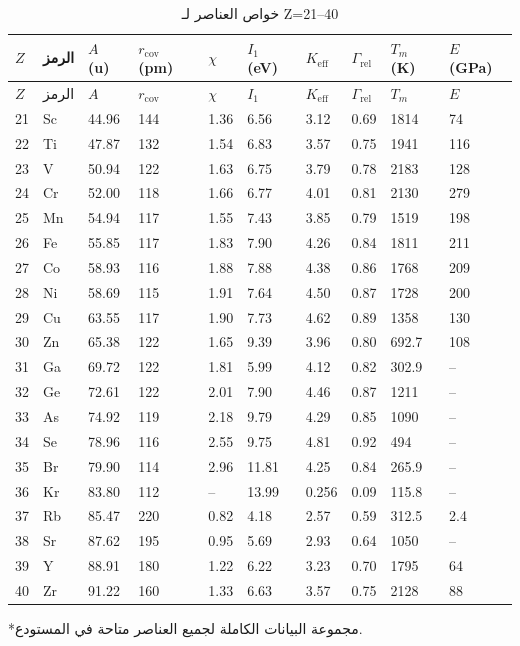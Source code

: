 \documentclass[11pt,a4paper]{article}
\newcommand{\Keff}{K_{\mathrm{eff}}}
\begin{document}
\begin{otherlanguage}{arabic}
		\begin{longtable}{p{0.6cm}p{1.2cm}p{1.2cm}p{1.2cm}p{1.2cm}p{1.2cm}p{1.5cm}p{1.2cm}p{1.2cm}p{1.2cm}}
			\caption{خواص العناصر لـ Z=21–40} \label{tab:elem-data-21to40} \\
			\toprule
			\(Z\) & الرمز & \(A\) (u) & \(r_{\text{cov}}\) (pm) & \(\chi\) & \(I_1\) (eV) & \(\Keff\) & \(\Gamma_{\text{rel}}\) & \(T_m\) (K) & \(E\) (GPa) \\
			\midrule
			\endfirsthead
			\toprule
			\(Z\) & الرمز & \(A\) & \(r_{\text{cov}}\) & \(\chi\) & \(I_1\) & \(\Keff\) & \(\Gamma_{\text{rel}}\) & \(T_m\) & \(E\) \\
			\midrule
			\endhead
			21 & Sc & 44.96 & 144 & 1.36 & 6.56 & 3.12 & 0.69 & 1814 & 74 \\
			22 & Ti & 47.87 & 132 & 1.54 & 6.83 & 3.57 & 0.75 & 1941 & 116 \\
			23 & V  & 50.94 & 122 & 1.63 & 6.75 & 3.79 & 0.78 & 2183 & 128 \\
			24 & Cr & 52.00 & 118 & 1.66 & 6.77 & 4.01 & 0.81 & 2130 & 279 \\
			25 & Mn & 54.94 & 117 & 1.55 & 7.43 & 3.85 & 0.79 & 1519 & 198 \\
			26 & Fe & 55.85 & 117 & 1.83 & 7.90 & 4.26 & 0.84 & 1811 & 211 \\
			27 & Co & 58.93 & 116 & 1.88 & 7.88 & 4.38 & 0.86 & 1768 & 209 \\
			28 & Ni & 58.69 & 115 & 1.91 & 7.64 & 4.50 & 0.87 & 1728 & 200 \\
			29 & Cu & 63.55 & 117 & 1.90 & 7.73 & 4.62 & 0.89 & 1358 & 130 \\
			30 & Zn & 65.38 & 122 & 1.65 & 9.39 & 3.96 & 0.80 & 692.7 & 108 \\
			31 & Ga & 69.72 & 122 & 1.81 & 5.99 & 4.12 & 0.82 & 302.9 & – \\
			32 & Ge & 72.61 & 122 & 2.01 & 7.90 & 4.46 & 0.87 & 1211 & – \\
			33 & As & 74.92 & 119 & 2.18 & 9.79 & 4.29 & 0.85 & 1090 & – \\
			34 & Se & 78.96 & 116 & 2.55 & 9.75 & 4.81 & 0.92 & 494 & – \\
			35 & Br & 79.90 & 114 & 2.96 & 11.81 & 4.25 & 0.84 & 265.9 & – \\
			36 & Kr & 83.80 & 112 & –    & 13.99 & 0.256 & 0.09 & 115.8 & – \\
			37 & Rb & 85.47 & 220 & 0.82 & 4.18 & 2.57 & 0.59 & 312.5 & 2.4 \\
			38 & Sr & 87.62 & 195 & 0.95 & 5.69 & 2.93 & 0.64 & 1050 & – \\
			39 & Y  & 88.91 & 180 & 1.22 & 6.22 & 3.23 & 0.70 & 1795 & 64 \\
			40 & Zr & 91.22 & 160 & 1.33 & 6.63 & 3.57 & 0.75 & 2128 & 88 \\
			\bottomrule
		\end{longtable}
		*مجموعة البيانات الكاملة لجميع العناصر متاحة في المستودع.
		

\end{otherlanguage}
\end{document}
